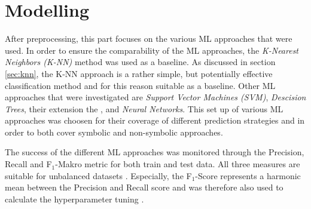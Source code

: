 \chapter{Modelling}\label{sec:data_mining}





After preprocessing, this part focuses on the various ML approaches that were used. In order to ensure the comparability of the ML approaches, the \textit{K-Nearest Neighbors (K-NN)} method was used as a baseline. As discussed in section \ref{sec:knn}, the K-NN approach is a rather simple, but potentially effective classification method and for this reason suitable as a baseline. Other ML approaches that were investigated are \textit{Support Vector Machines (SVM)}, \textit{Descision Trees}, their extension the , and \textit{Neural Networks}. This set up of various ML approaches was choosen for their coverage of different prediction strategies and in order to both cover symbolic and non-symbolic approaches.

The success of the different ML approaches was monitored through the Precision, Recall and F$_1$-Makro metric for both train and test data. All three measures are suitable for unbalanced datasets \citep{Brownlee2020}. Especially, the F$_1$-Score represents a harmonic mean between the Precision and Recall score and was therefore also used to calculate the hyperparameter tuning \citep{Peltarion2021}.


